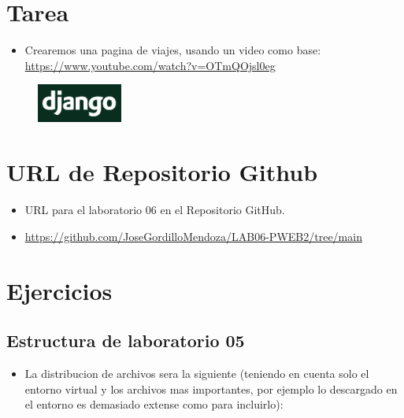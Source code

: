 \documentclass{article}
\begin{document}
	\section{Tarea}
	\begin{itemize}		
		\item Crearemos una pagina de viajes, usando un video como base: \url{https://www.youtube.com/watch?v=OTmQOjsl0eg}
	\end{itemize}
        \begin{figure}[H]
		\centering
		\includegraphics[width=0.25\textwidth,keepaspectratio]{img/django.png}
	\end{figure}

	\section{URL de Repositorio Github}
	\begin{itemize}
		\item URL para el laboratorio 06 en el Repositorio GitHub.
		\item \url{https://github.com/JoseGordilloMendoza/LAB06-PWEB2/tree/main}
	\end{itemize}
	
	\section{Ejercicios}
 
        \subsection{Estructura de laboratorio 05}
	\begin{itemize}	
		\item La distribucion de archivos sera la siguiente (teniendo en cuenta solo el entorno virtual y los archivos mas importantes, por ejemplo lo descargado en el entorno es demasiado extense como para incluirlo):
	\end{itemize}
	
\end{document}
